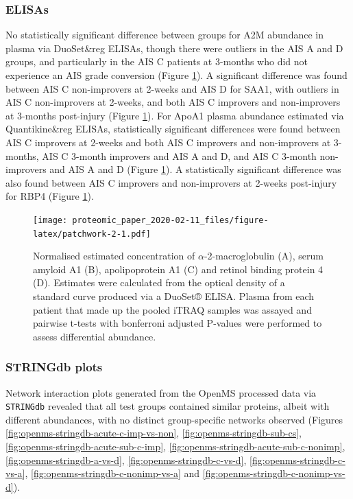 \documentclass[9pt,lineno]{elife}
\begin{document}
\hypertarget{elisas}{%
\subsubsection{ELISAs}\label{elisas}}

No statistically significant difference between groups for A2M abundance in plasma via DuoSet\&reg ELISAs, though there were outliers in the AIS A and D groups, and particularly in the AIS C patients at 3-months who did not experience an AIS grade conversion (Figure \ref{fig:patchwork-2}).
A significant difference was found between AIS C non-improvers at 2-weeks and AIS D for SAA1, with outliers in AIS C non-improvers at 2-weeks, and both AIS C improvers and non-improvers at 3-months post-injury (Figure \ref{fig:patchwork-2}).
For ApoA1 plasma abundance estimated via Quantikine\&reg ELISAs, statistically significant differences were found between AIS C improvers at 2-weeks and both AIS C improvers and non-improvers at 3-months, AIS C 3-month improvers and AIS A and D, and AIS C 3-month non-improvers and AIS A and D (Figure \ref{fig:patchwork-2}).
A statistically significant difference was also found between AIS C improvers and non-improvers at 2-weeks post-injury for RBP4 (Figure \ref{fig:patchwork-2}).



\begin{figure}
\centering
\texttt{[image: proteomic\_paper\_2020-02-11\_files/figure-latex/patchwork-2-1.pdf]}
\caption{\label{fig:patchwork-2}Normalised estimated concentration of \(\alpha\)-2-macroglobulin (A), serum amyloid A1 (B), apolipoprotein A1 (C) and retinol binding protein 4 (D). Estimates were calculated from the optical density of a standard curve produced via a DuoSet® ELISA. Plasma from each patient that made up the pooled iTRAQ samples was assayed and pairwise t-tests with bonferroni adjusted P-values were performed to assess differential abundance.}
\end{figure}

\hypertarget{stringdb-plots}{%
\subsubsection{STRINGdb plots}\label{stringdb-plots}}

Network interaction plots generated from the OpenMS processed data via \texttt{STRINGdb} revealed that all test groups contained similar proteins, albeit with different abundances, with no distinct group-specific networks observed (Figures \ref{fig:openms-stringdb-acute-c-imp-vs-non}, \ref{fig:openms-stringdb-sub-cs}, \ref{fig:openms-stringdb-acute-sub-c-imp}, \ref{fig:openms-stringdb-acute-sub-c-nonimp}, \ref{fig:openms-stringdb-a-vs-d}, \ref{fig:openms-stringdb-c-vs-d}, \ref{fig:openms-stringdb-c-vs-a}, \ref{fig:openms-stringdb-c-nonimp-vs-a} and \ref{fig:openms-stringdb-c-nonimp-vs-d}).
\end{document}
